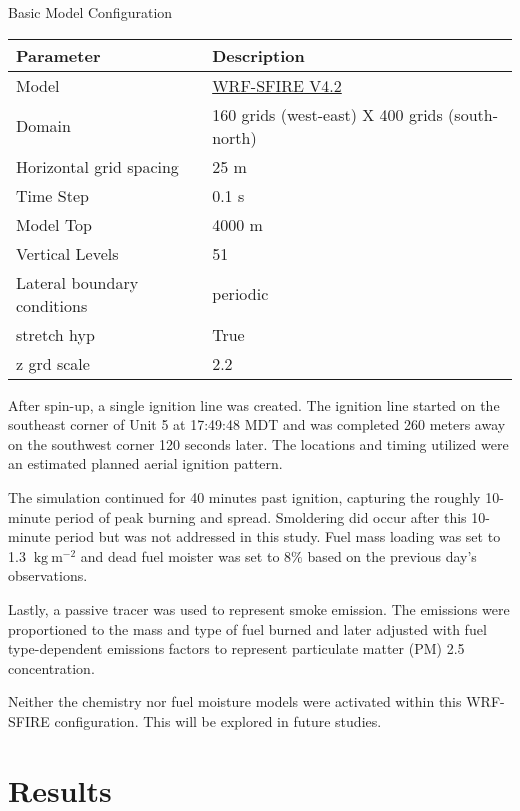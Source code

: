 \documentclass[preprints,article,accept,moreauthors,pdftex]{Definitions/mdpi}
\begin{document}
\begin{specialtable}[H]
  \centering
  \caption{Basic Model Configuration\label{tab1}}
  \begin{tabular}{ll}
  \toprule
  \textbf{Parameter}	& \textbf{Description}\\
  \midrule
   Model		& \href{https://github.com/openwfm/WRF-SFIRE/tree/a2c3118f08ce424885705e9155b127ea28879f8b}{WRF-SFIRE V4.2}\\
   Domain		& 160 grids (west-east) X 400 grids (south-north)\\
   Horizontal grid spacing		& 25 m\\
   Time Step	& 0.1 s\\
   Model Top		& 4000 m\\
   Vertical Levels		& 51\\
   Lateral boundary conditions	& periodic\\
   stretch hyp & True\\
   z grd scale & 2.2\\
  \bottomrule
  \end{tabular}
  \end{specialtable}

After spin-up, a single ignition line was created. The ignition line started on the southeast corner of Unit 5 at 17:49:48 MDT and was completed 260 meters away on the southwest corner 120 seconds later. The locations and timing utilized were an estimated planned aerial ignition pattern.

The simulation continued for 40 minutes past ignition, capturing the roughly 10-minute period of peak burning and spread. Smoldering did occur after this 10-minute period but was not addressed in this study. Fuel mass loading was set to 1.3 $\mathrm{~kg}\mathrm{~m}^{-2}$ and dead fuel moister was set to 8$\%$ based on the previous day’s observations.

Lastly, a passive tracer was used to represent smoke emission. The emissions were proportioned to the mass and type of fuel burned and later adjusted with fuel type-dependent emissions factors to represent particulate matter (PM) 2.5 concentration.

Neither the chemistry nor fuel moisture models were activated within this WRF-SFIRE configuration. This will be explored in future studies.
\section{Results}
\end{document}
